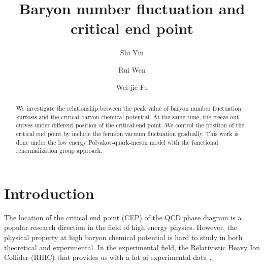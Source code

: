 \documentclass[%
reprint,
superscriptaddress,
showpacs,preprintnumbers,
 amsmath,amssymb,
 aps,
prl,
]{revtex4-1}
\begin{document}
\preprint{}

\title{Baryon number fluctuation and critical end point
}

\author{Shi Yin}

\author{Rui Wen}

\author{Wei-jie Fu}


\begin{abstract}

We investigate the relationship between the peak value of baryon number fluctuation kurtosis and the critical baryon chemical potential. At the same time, the freeze-out curves under different position of the critical end point. We control the position of the critical end point by include the fermion vacuum fluctuation gradually. This work is done under the low energy Polyakov-quark-meson model with the functional renormalization group approach.

\end{abstract}

\maketitle



\section{Introduction}
\label{sec:int}

The location of the critical end point (CEP) of the QCD phase diagram is a popular research direction in the field of high energy physics. However, the physical property at high baryon chemical potential is hard to study in both theoretical and experimental. In the experimental field, the Relativistic Heavy Ion Collider (RHIC) that provides us with a lot of experimental data \cite{Adamczyk:2013dal,Luo:2015ewa,Luo:2017faz}.
\end{document}
